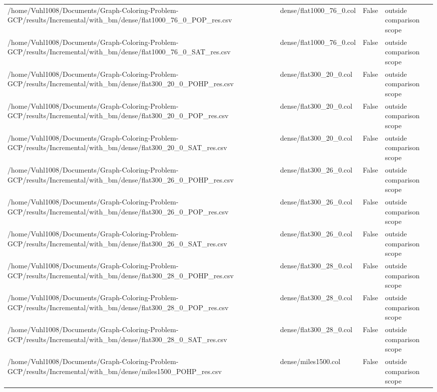 \begin{table}[htbp]
\begin{tabular}{llll}
/home/Vuhl1008/Documents/Graph-Coloring-Problem-GCP/results/Incremental/with\_bm/dense/flat1000\_76\_0\_POP\_res.csv & dense/flat1000\_76\_0.col & False & outside comparison scope \\
/home/Vuhl1008/Documents/Graph-Coloring-Problem-GCP/results/Incremental/with\_bm/dense/flat1000\_76\_0\_SAT\_res.csv & dense/flat1000\_76\_0.col & False & outside comparison scope \\
/home/Vuhl1008/Documents/Graph-Coloring-Problem-GCP/results/Incremental/with\_bm/dense/flat300\_20\_0\_POHP\_res.csv & dense/flat300\_20\_0.col & False & outside comparison scope \\
/home/Vuhl1008/Documents/Graph-Coloring-Problem-GCP/results/Incremental/with\_bm/dense/flat300\_20\_0\_POP\_res.csv & dense/flat300\_20\_0.col & False & outside comparison scope \\
/home/Vuhl1008/Documents/Graph-Coloring-Problem-GCP/results/Incremental/with\_bm/dense/flat300\_20\_0\_SAT\_res.csv & dense/flat300\_20\_0.col & False & outside comparison scope \\
/home/Vuhl1008/Documents/Graph-Coloring-Problem-GCP/results/Incremental/with\_bm/dense/flat300\_26\_0\_POHP\_res.csv & dense/flat300\_26\_0.col & False & outside comparison scope \\
/home/Vuhl1008/Documents/Graph-Coloring-Problem-GCP/results/Incremental/with\_bm/dense/flat300\_26\_0\_POP\_res.csv & dense/flat300\_26\_0.col & False & outside comparison scope \\
/home/Vuhl1008/Documents/Graph-Coloring-Problem-GCP/results/Incremental/with\_bm/dense/flat300\_26\_0\_SAT\_res.csv & dense/flat300\_26\_0.col & False & outside comparison scope \\
/home/Vuhl1008/Documents/Graph-Coloring-Problem-GCP/results/Incremental/with\_bm/dense/flat300\_28\_0\_POHP\_res.csv & dense/flat300\_28\_0.col & False & outside comparison scope \\
/home/Vuhl1008/Documents/Graph-Coloring-Problem-GCP/results/Incremental/with\_bm/dense/flat300\_28\_0\_POP\_res.csv & dense/flat300\_28\_0.col & False & outside comparison scope \\
/home/Vuhl1008/Documents/Graph-Coloring-Problem-GCP/results/Incremental/with\_bm/dense/flat300\_28\_0\_SAT\_res.csv & dense/flat300\_28\_0.col & False & outside comparison scope \\
/home/Vuhl1008/Documents/Graph-Coloring-Problem-GCP/results/Incremental/with\_bm/dense/miles1500\_POHP\_res.csv & dense/miles1500.col & False & outside comparison scope \\

\end{tabular}
\end{table}
